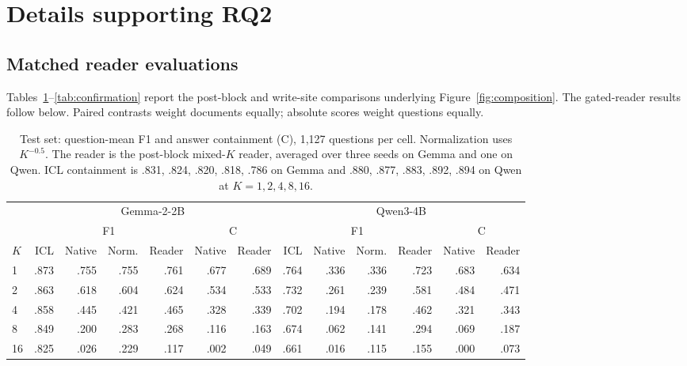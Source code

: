 \section{Details supporting RQ2}
\label{sec:numerical-results}

\subsection{Matched reader evaluations}
\label{sec:composition-tables}
Tables~\ref{tab:composition}--\ref{tab:confirmation} report the post-block
and write-site comparisons underlying Figure~\ref{fig:composition}.
The gated-reader results follow below. Paired contrasts weight documents
equally; absolute scores weight questions equally.

\begin{table}[t]
\centering
\caption{Test set: question-mean F1 and answer containment (C), 1,127
questions per cell. Normalization uses $K^{-0.5}$. The reader is the post-block
mixed-$K$ reader, averaged over three seeds on Gemma and one on Qwen. ICL
containment is .831, .824, .820, .818, .786 on Gemma and .880, .877, .883, .892, .894
on Qwen at $K=1,2,4,8,16$.}
\label{tab:composition}
\small\setlength{\tabcolsep}{4pt}
\begin{tabular}{@{}lrrrrrrrrrrrr@{}}
\toprule
& \multicolumn{6}{c}{Gemma-2-2B} & \multicolumn{6}{c}{Qwen3-4B} \\
\cmidrule(lr){2-7}\cmidrule(l){8-13}
& \multicolumn{4}{c}{F1} & \multicolumn{2}{c}{C} & \multicolumn{4}{c}{F1} & \multicolumn{2}{c}{C} \\
$K$ & ICL & Native & Norm. & Reader & Native & Reader & ICL & Native & Norm. & Reader & Native & Reader \\
\midrule
1 & .873 & .755 & .755 & .761 & .677 & .689 & .764 & .336 & .336 & .723 & .683 & .634 \\
2 & .863 & .618 & .604 & .624 & .534 & .533 & .732 & .261 & .239 & .581 & .484 & .471 \\
4 & .858 & .445 & .421 & .465 & .328 & .339 & .702 & .194 & .178 & .462 & .321 & .343 \\
8 & .849 & .200 & .283 & .268 & .116 & .163 & .674 & .062 & .141 & .294 & .069 & .187 \\
16 & .825 & .026 & .229 & .117 & .002 & .049 & .661 & .016 & .115 & .155 & .000 & .073 \\
\bottomrule
\end{tabular}
\end{table}

